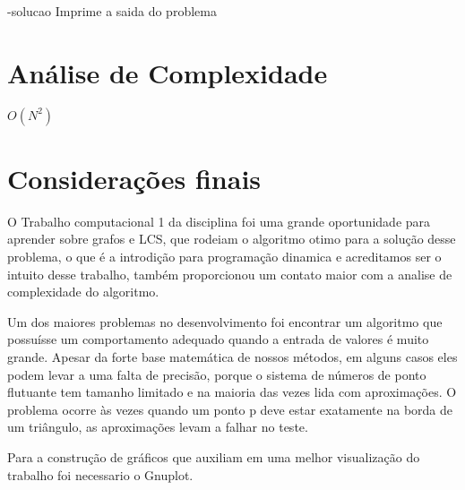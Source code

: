 \documentclass[12pt,a4paper]{article}
\begin{document}
-solucao
Imprime a saida do problema

\section{Análise de Complexidade}

$O(N^2)$

\section{Considerações finais}

O Trabalho computacional 1 da disciplina foi uma grande oportunidade para aprender sobre grafos e LCS, que rodeiam o algoritmo otimo para a solução desse problema, o que é a introdição para programação dinamica e acreditamos ser o intuito desse trabalho, também proporcionou um contato maior com a analise de complexidade do algoritmo. 

Um dos maiores problemas no desenvolvimento foi encontrar um algoritmo que possuísse um comportamento adequado quando a entrada de valores é muito grande. Apesar da forte base matemática de nossos métodos, em alguns casos eles podem levar a uma falta de precisão, porque o sistema de números de ponto flutuante tem tamanho limitado e na maioria das vezes lida com aproximações. O problema ocorre às vezes quando um ponto p deve estar exatamente na borda de um triângulo, as aproximações levam a falhar no teste. 

Para a construção de gráficos que auxiliam em uma melhor visualização do trabalho foi necessario o Gnuplot.


\begin{flushleft}
	\nocite{*}
	
\end{flushleft}
\end{document}
